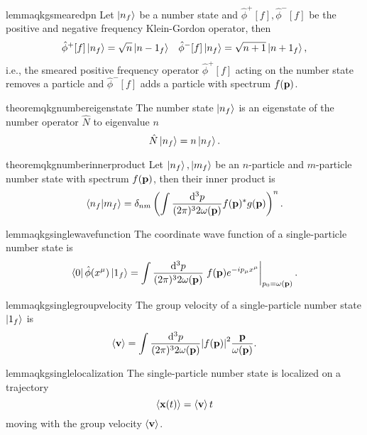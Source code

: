 \begin{restatable}{lemma}{qkgsmearedpn}\label{thm:qkg_smeared_pn}
	Let $\ket{n_f}$ be a number state and $\hat\phi^+[f],\hat\phi^-[f]$ be the positive and negative frequency Klein-Gordon operator, then
	\begin{align}
		\hat\phi^+[f]
		\ket{n_f}
		=
		\sqrt{n}
		\ket{n-1_f}
		&&
		\hat\phi^-[f]
		\ket{n_f}
		=
		\sqrt{n+1}
		\ket{n+1_f}
		,
	\end{align}
	i.e., the smeared positive frequency operator $\hat\phi^+[f]$ acting on the number state removes a particle and $\hat\phi^-[f]$ adds a particle with spectrum $f(\vb{p})$.
\end{restatable}
\begin{restatable}{theorem}{qkgnumbereigenstate}\label{thm:qkg_number_state_eigenstate}
	The number state $\ket{n_f}$ is an eigenstate of the number operator $\hat{N}$ to eigenvalue $n$
	\begin{equation}
		\hat{N}
		\ket{n_f}
		=
		n
		\ket{n_f}
		.
	\end{equation}
\end{restatable}
\begin{restatable}{theorem}{qkgnumberinnerproduct}\label{thm:qkg_number_state_inner_product}
	Let $\ket{n_f},\ket{m_f}$ be an $n$-particle and $m$-particle number state with spectrum $f(\vb{p})$, then their inner product is
	\begin{equation}
		\braket{n_f}{m_f}
		=
		\delta_{nm}
		\left(
			\int\frac{\dd[3]{p}}{(2\pi)^32\omega(\vb{p})}
			f(\vb{p})^*
			g(\vb{p})
		\right)^n
		.
	\end{equation}
\end{restatable}

\begin{restatable}{lemma}{qkgsinglewavefunction}\label{thm:qkg_number_state_single_wave_function}
	The coordinate wave function of a single-particle number state is
	\begin{equation}
		\bra{0}
		\hat\phi(x^\mu)
		\ket{1_f}
		=
		\int\frac{\dd[3]{p}}{(2\pi)^32\omega(\vb{p})}
		\eval{
			f(\vb{p})
			e^{-ip_\mu x^\mu}
		}_{p_0=\omega(\vb{p})}
		.
	\end{equation}
\end{restatable}
\begin{restatable}{lemma}{qkgsinglegroupvelocity}\label{thm:number_state_single_group_velocity}
	The group velocity of a single-particle number state $\ket{1_f}$ is
	\begin{equation}
		\expval{\vb{v}}
		=
		\int\frac{\dd[3]{p}}{(2\pi)^32\omega(\vb{p})}
		\abs{f(\vb{p})}^2
		\frac{\vb{p}}{\omega(\vb{p})}
		\label{eq:single_particle_number_state_group_velocity}
		.
	\end{equation}
\end{restatable}
\begin{restatable}{lemma}{qkgsinglelocalization}
	The single-particle number state is localized on a trajectory
	\begin{equation}
		\expval{\vb{x}(t)}
		=
		\expval{\vb{v}}t
	\end{equation}
	moving with the group velocity $\expval{\vb{v}}$.
\end{restatable}